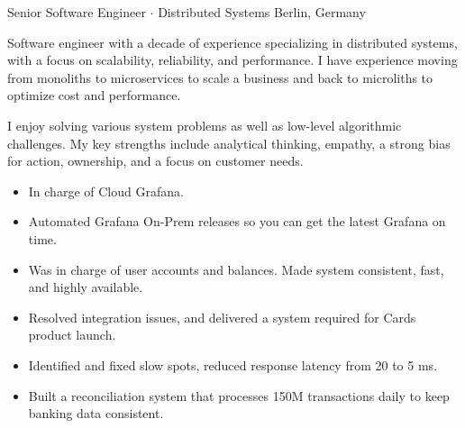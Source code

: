 \documentclass[a4paper,10pt]{article}
\begin{document}
    {Senior Software Engineer $\cdot$ Distributed Systems}
    {Berlin, Germany}

    \begin{lede}
        Software engineer with a decade of experience specializing in distributed systems, with a focus on scalability, reliability, and performance.
        I have experience moving from monoliths to microservices to scale a business and back to microliths
        to optimize cost and performance.

        \vspace{5pt}

        I enjoy solving various system problems as well as low-level algorithmic challenges.
        My key strengths include analytical thinking, empathy, a strong bias for action, ownership, and a focus on customer needs.
    \end{lede}

    \begin{skills}
    \end{skills}



    \begin{itemize}
        \item In charge of Cloud Grafana.
        \item Automated Grafana On-Prem releases so you can get the latest Grafana on time.
    \end{itemize}

    \begin{itemize}
        \item Was in charge of user accounts and balances.
        Made system consistent, fast, and highly available.
        \item Resolved integration issues, and delivered a system required for Cards product launch.
        \item Identified and fixed slow spots, reduced response latency from 20 to 5 ms.
        \item Built a reconciliation system that processes 150M transactions daily to keep banking data consistent.
    \end{itemize}
\end{document}
